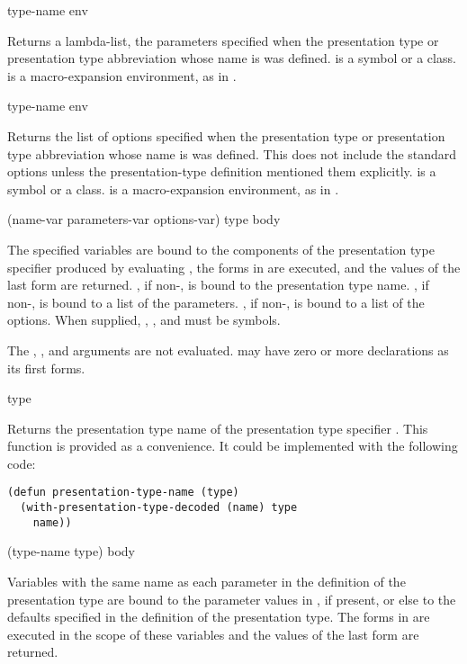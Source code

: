  {type-name \optional env}

Returns a lambda-list, the parameters specified when the presentation type or
presentation type abbreviation whose name is  was defined.
 is a symbol or a class.   is a macro-expansion
environment, as in .


 {type-name \optional env}

Returns the list of options specified when the presentation type or presentation
type abbreviation whose name is  was defined.  This does not
include the standard options unless the presentation-type definition mentioned
them explicitly.   is a symbol or a class.   is a
macro-expansion environment, as in .


 {(name-var \optional parameters-var options-var)
                                            type
                                            \body body}

The specified variables are bound to the components of the presentation type
specifier produced by evaluating , the forms in  are
executed, and the values of the last form are returned.  , if
non-, is bound to the presentation type name.  , if
non-, is bound to a list of the parameters.  , if
non-, is bound to a list of the options.  When supplied, ,
, and  must be symbols.

The , , and  arguments are
not evaluated.   may have zero or more declarations as its first
forms.

 {type}

Returns the presentation type name of the presentation type specifier .
This function is provided as a convenience.  It could be implemented with the
following code:

\begin{verbatim}
(defun presentation-type-name (type)
  (with-presentation-type-decoded (name) type
    name))
\end{verbatim}

 {(type-name type) \body body}

Variables with the same name as each parameter in the definition of the
presentation type are bound to the parameter values in , if present,
or else to the defaults specified in the definition of the presentation type.
The forms in  are executed in the scope of these variables and the
values of the last form are returned.

